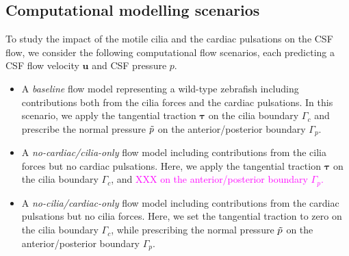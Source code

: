 \documentclass[fleqn]{wlscirep}
\newcommand{\Gc}{\Gamma_{c}}
\newcommand{\Gp}{\Gamma_{p}}
\newcommand{\uu}{\mathbf{u}}
\newcommand{\btau}{\bm{\tau}}
\newcommand{\mer}[1]{\textcolor{magenta}{#1}}
\begin{document}
\subsection*{Computational modelling scenarios}
To study the impact of the motile cilia and the cardiac pulsations on the CSF flow, we consider the following computational flow scenarios, each predicting a CSF flow velocity $\uu$ and CSF pressure $p$.
\begin{itemize}
    \item A \emph{baseline} flow model representing a wild-type zebrafish including contributions both from the cilia forces and the cardiac pulsations. In this scenario, we apply the tangential traction $\btau$ on the cilia boundary $\Gc$ and prescribe the normal pressure $\Tilde{p}$ on the anterior/posterior boundary $\Gp$. %

    \item A \emph{no-cardiac/cilia-only} flow model including contributions from the cilia forces but no cardiac pulsations. Here, we apply the tangential traction $\btau$ on the cilia boundary $\Gc$, and \mer{XXX on the anterior/posterior boundary $\Gp$.} %

    \item A \emph{no-cilia/cardiac-only} flow model including contributions from the cardiac pulsations but no cilia forces. Here, we set the tangential traction to zero on the cilia boundary $\Gc$, while prescribing the normal pressure $\Tilde{p}$ on the anterior/posterior boundary $\Gp$.  %

\end{itemize}
\end{document}

